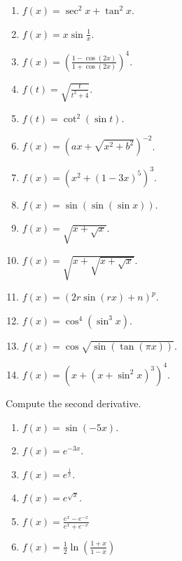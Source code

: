 \begin{problem}
\begin{multicols}{3}
\begin{enumerate}
\item $\displaystyle f(x)= \sec^2 x+\tan^2 x$.
\item $\displaystyle f(x)=x\sin \frac{1}{x} $.
\item $\displaystyle f(x)= \left(\frac{1-\cos (2x)}{1+\cos (2x)}\right)^4$.
\item $\displaystyle f(t)=\sqrt{\frac{t}{t^2+4}} $.
\item $\displaystyle f(t)= \cot^2(\sin t)$.
\item $\displaystyle f(x)= (a x+\sqrt{x^2+b^2})^{-2}$.
\item $\displaystyle f(x)= \left(x^2+(1-3x)^5\right)^3$.
\item $\displaystyle f(x)=\sin (\sin (\sin x))$.
\item $\displaystyle f(x)= \sqrt{x+\sqrt{x}}$.
\item $\displaystyle f(x)= \sqrt{x+\sqrt{x+\sqrt{x}}}$.
\item $\displaystyle f(x)=(2r \sin (r x)+n)^p $.
\item $\displaystyle f(x)=\cos^4(\sin^3 x) $.
\item $\displaystyle f(x)=\cos \sqrt{\sin (\tan (\pi x))} $.
\item $\displaystyle f(x)=\left(x+(x+\sin^2 x)^3 \right)^4 $.
\end{enumerate}
\end{multicols}
\end{problem}
\begin{problem}Compute the second derivative.
\begin{multicols}{3}
\begin{enumerate}
\item $\displaystyle f(x)=\sin (-5x)$. 
\item $\displaystyle f(x)=e^{-3x}$. 
\item $\displaystyle f(x)=e^{\frac{1}x}$. 
\item $\displaystyle f(x)=e^{\sqrt{x}}$. 
\item $\displaystyle f(x)=\frac{e^{x}-e^{-x}}{e^x+e^{-x}} $
\item $\displaystyle f(x)=\frac{1}2\ln \left(\frac{1+x}{1-x}\right) $
\end{enumerate}
\end{multicols}
\end{problem}